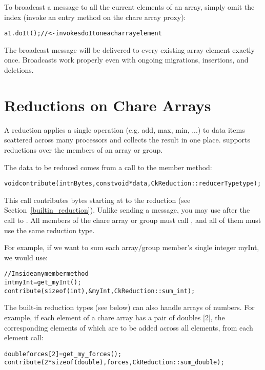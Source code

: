 To  broadcast a message to all the current elements of
an array, simply omit the index (invoke an entry method on the chare array
proxy):
%
\begin{alltt}
a1.doIt(); //<- invokes doIt on each array element
\end{alltt}
%
The broadcast message will be delivered to every existing array element exactly
once. Broadcasts work properly even with ongoing migrations, insertions, and
deletions.

\section{Reductions on Chare Arrays}
\label{reductions}

A reduction applies a single operation (e.g. add,
max, min, ...) to data items scattered across many processors and
collects the result in one place.  \charmpp{} supports reductions
over the members of an array or group.

The data to be reduced comes from a call to the member  
method:
\begin{alltt}
void contribute(int nBytes, const void *data, CkReduction::reducerType type);
\end{alltt}

This call contributes  bytes starting at  to the
reduction  (see Section~\ref{builtin_reduction}).  Unlike sending a
message, you may use  after the call to .  All
members of the chare array or group must call , 
and all of them must use the same reduction type.  


For example, if we want to sum each array/group member's single integer myInt, 
we would use:

\begin{alltt}
    // Inside any member method
    int myInt=get_myInt();
    contribute(sizeof(int),\&myInt,CkReduction::sum_int);
\end{alltt}

The built-in reduction types (see below) can also handle arrays of
numbers.  For example, if each element of a chare array has a pair of
doubles [2], the corresponding elements of which are to be added across
all elements, from each element call:

\begin{alltt}
    double forces[2]=get_my_forces();
    contribute(2*sizeof(double),forces,CkReduction::sum_double);
\end{alltt}

